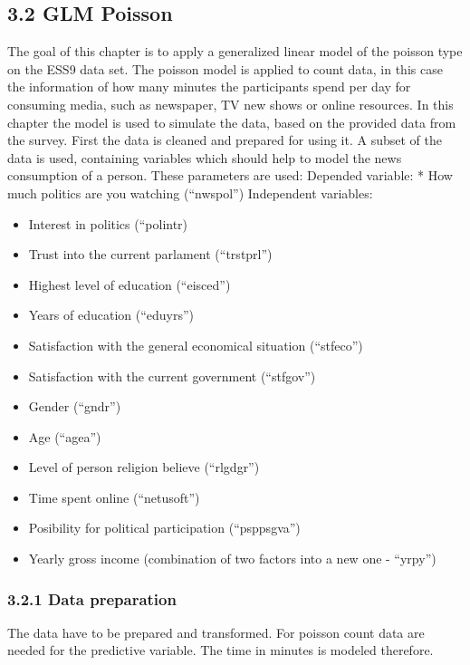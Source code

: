 \documentclass[
]{article}
\providecommand{\tightlist}{%
  \setlength{\itemsep}{0pt}\setlength{\parskip}{0pt}}
\begin{document}
\hypertarget{glm-poisson}{%
\subsection{3.2 GLM Poisson}\label{glm-poisson}}

The goal of this chapter is to apply a generalized linear model of the
poisson type on the ESS9 data set. The poisson model is applied to count
data, in this case the information of how many minutes the participants
spend per day for consuming media, such as newspaper, TV new shows or
online resources. In this chapter the model is used to simulate the
data, based on the provided data from the survey. First the data is
cleaned and prepared for using it. A subset of the data is used,
containing variables which should help to model the news consumption of
a person. These parameters are used: Depended variable: * How much
politics are you watching (``nwspol'') Independent variables:

\begin{itemize}
\tightlist
\item
  Interest in politics (``polintr)
\item
  Trust into the current parlament (``trstprl'')
\item
  Highest level of education (``eisced'')
\item
  Years of education (``eduyrs'')
\item
  Satisfaction with the general economical situation (``stfeco'')
\item
  Satisfaction with the current government (``stfgov'')
\item
  Gender (``gndr'')
\item
  Age (``agea'')
\item
  Level of person religion believe (``rlgdgr'')
\item
  Time spent online (``netusoft'')
\item
  Posibility for political participation (``psppsgva'')
\item
  Yearly gross income (combination of two factors into a new one -
  ``yrpy'')
\end{itemize}

\hypertarget{data-preparation}{%
\subsubsection{3.2.1 Data preparation}\label{data-preparation}}

The data have to be prepared and transformed. For poisson count data are
needed for the predictive variable. The time in minutes is modeled
therefore.
\end{document}
